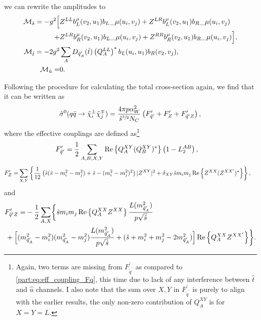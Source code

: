 \documentclass[../main.tex]{subfiles}
\begin{document}
we can rewrite the amplitudes to
\begin{subequations}
  \begin{align}
    \nonumber
    \mathcal{M}_{\hat{s}} = -g^2 \Big[ &
    Z^{LL} b_L^\mu(v_2, u_1){b_L}\_{\mu}(u_i, v_j) + Z^{LR} b_L^\mu(v_2, u_1){b_R}\_{\mu}(u_i, v_j)                         \\
    +                         & Z^{LR} b_{R}^\mu(v_2, u_1){b_L}\_{\mu}(u_i, v_j) +
    Z^{RR} b_R^\mu(v_2, u_1){b_R}\_{\mu}(u_i, v_j) \Big],                                                                   \\
    \mathcal{M}_{\hat{t}} = -2g^2      & \sum_A D_{\tilde{q}^\prime_A}(\hat{t}) \left(Q_A^{LL}\right)^\ast b_L(u_i, u_1) b_R(v_2, v_j), \\
    \mathcal{M}_{\hat{u}} =            & 0.
  \end{align}
\end{subequations}

Following the procedure for calculating the total cross-section again, we find that it can be written as
\begin{equation}
  \hat\sigma^0(q\bar{q} \to \tilde\chi^\pm_i \tilde\chi^\mp_j) = \frac{4 \pi p \alpha_W^2}{\hat{s}^{\sfrac{3}{2}} N_C} \left(F^\prime_{\tilde{q}^\prime} + F^\prime_Z + F^\prime_{\tilde{q}^\prime Z}\right),
\end{equation}
where the effective couplings are defined as\footnote{Again, two terms are missing from \(F^{\prime}_{\tilde{q}^\prime}\) as compared to \cref{part:eq:eff_coupling_Fq}, this time due to lack of any interference between \(\hat{t}\) and \(\hat{u}\) channels. I also note that the sum over \(X, Y\) in \(F^\prime_{\tilde{q}^\prime}\) is purely to align with the earlier results, the only non-zero contribution of \(Q_A^{XY}\) is for \(X = Y = L\).}
\begin{align}
  \label{part:eq:CC_eff_coupling_Fq}
  F^{\prime}_{\tilde{q}^\prime} = \frac{1}{2} \sum_{A,B,X,Y} & \operatorname{Re}\left\{Q_A^{XY} (Q_B^{XY})^\ast\right\} \left(1 - L_2^{AB}\right),
\end{align}
\begin{align}
  \label{part:eq:CC_eff_coupling_FZ}
  F^{\prime}_{Z} = & \sum_{X,Y} \left\{\frac{1}{12} \left(\hat{s}(\hat{s}-m_i^2-m_j^2) + \hat{s} - (m_i^2-m_j^2)^2\right) |Z^{XY}|^2 + \delta_{XY} \hat{s}m_i m_j \operatorname{Re}\left\{Z^{XX} (Z^{XX^\prime})^\ast\right\}\right\},
\end{align}
and
\begin{align}
  \label{part:eq:CC_eff_coupling_FqZ}
  \nonumber
  F^\prime_{\tilde{q}^\prime Z} = & -\frac{1}{2} \sum_{A,X} \biggl\{
  \hat{s} m_i m_j \Re{Q_{A}^{XX} Z^{XX}}\frac{L(m_{\tilde{q}^\prime_A}^2)}{p \sqrt{\hat{s}}}                                                                                                                                                                               \\
                                  & \hspace{-1cm}+ \Bigl[(m_{\tilde{q}^\prime_A}^2-m_i^2)(m_{\tilde{q}^\prime_A}^2-m_j^2) \frac{L(m_{\tilde{q}^\prime_A}^2)}{p \sqrt{\hat{s}}} + (\hat{s} + m_i^2 + m_j^2 - 2m_{\tilde{q}^\prime_A}^2)\Bigr] \Re{Q_{A}^{XX} Z^{XX^\prime}}
  \biggr\}.
\end{align}
\end{document}
